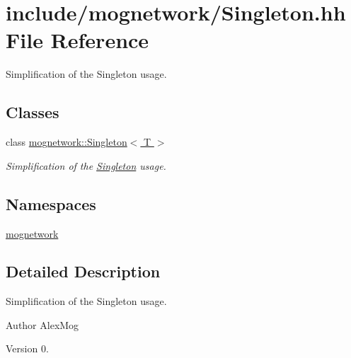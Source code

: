 \hypertarget{_singleton_8hh}{\section{include/mognetwork/\-Singleton.hh File Reference}
\label{_singleton_8hh}
}


Simplification of the Singleton usage.  


\subsection*{Classes}
\begin{DoxyCompactItemize}
\item 
class \hyperlink{classmognetwork_1_1_singleton}{mognetwork\-::\-Singleton$<$ T $>$}
\begin{DoxyCompactList}\small\item\em Simplification of the \hyperlink{classmognetwork_1_1_singleton}{Singleton} usage. \end{DoxyCompactList}\end{DoxyCompactItemize}
\subsection*{Namespaces}
\begin{DoxyCompactItemize}
\item 
\hyperlink{namespacemognetwork}{mognetwork}
\end{DoxyCompactItemize}


\subsection{Detailed Description}
Simplification of the Singleton usage. \begin{DoxyAuthor}{Author}
Alex\-Mog 
\end{DoxyAuthor}
\begin{DoxyVersion}{Version}
0. 
\end{DoxyVersion}
